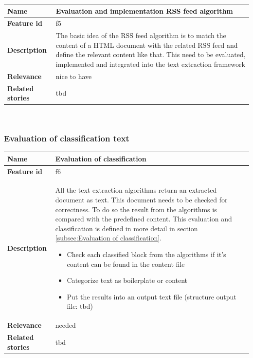 \begin{tabular}{ | p{3cm} | p{12cm} |}
	\hline
	\textbf{Name} 				& Evaluation and implementation RSS feed algorithm \\ \hline
	\textbf{Feature id} 		& f5 \\ \hline
	\textbf{Description} 		& The basic idea of the RSS feed algorithm is to match the content of a HTML document with the related RSS feed and define the relevant content like that. This need to be evaluated, implemented and integrated into the text extraction framework  \\ \hline
	\textbf{Relevance} 			& nice to have\\ \hline
	\textbf{Related stories} 	& tbd \\ \hline
	\end{tabular} \\

\subsubsection{Evaluation of classification text}
\label{subsec:Evaluation of classification text}

	\begin{tabular}{ | p{3cm} | p{12cm} |}
	\hline
	\textbf{Name} 				& Evaluation of classification \\ \hline
	\textbf{Feature id} 		& f6 \\ \hline
	\textbf{Description} 		& All the text extraction algorithms return an extracted document as text. This document needs to be checked for correctness. To do so the result from the algorithms is compared with the predefined content. This evaluation and classification is defined in more detail in section \ref{subsec:Evaluation of classification}.
								\begin{itemize}
							        \item Check each classified block from the algorithms if it's content can be found in the content file
							        \item Categorize text as boilerplate or content
							        \item Put the results into an output text file (structure output file: tbd)
						        \end{itemize} \\ \hline
	\textbf{Relevance} 			& needed\\ \hline
	\textbf{Related stories} 	& tbd \\ \hline
	\end{tabular} \\



